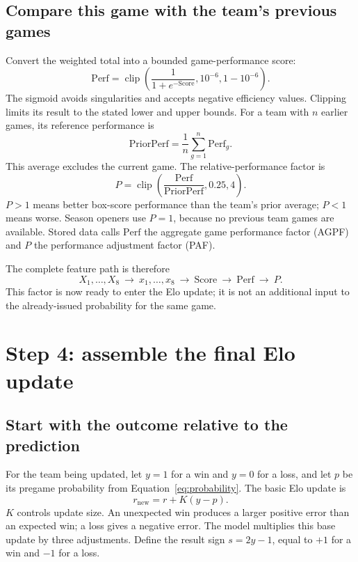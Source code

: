 \documentclass[11pt]{article}
\begin{document}
\subsection{Compare this game with the team's previous games}
Convert the weighted total into a bounded game-performance score:
\begin{equation}\label{eq:game-perf}
 \mathrm{Perf}=\operatorname{clip}
 \left(\frac{1}{1+e^{-\mathrm{Score}}},10^{-6},1-10^{-6}\right).
\end{equation}
The sigmoid avoids singularities and accepts negative efficiency values.
Clipping limits its result to the stated lower and upper bounds.
For a team with $n$ earlier games, its reference performance is
\begin{equation}\label{eq:prior-perf}
 \mathrm{PriorPerf}=\frac{1}{n}\sum_{g=1}^{n}\mathrm{Perf}_g.
\end{equation}
This average excludes the current game. The relative-performance factor is
\begin{equation}\label{eq:performance-factor}
 \boxed{P=\operatorname{clip}
 \left(\frac{\mathrm{Perf}}{\mathrm{PriorPerf}},0.25,4\right)}.
\end{equation}
$P>1$ means better box-score performance than the team's prior average;
$P<1$ means worse. Season openers use $P=1$, because no previous team games
are available. Stored data calls $\mathrm{Perf}$ the aggregate game performance
factor (AGPF) and $P$ the performance adjustment factor (PAF).

The complete feature path is therefore
\begin{equation}\label{eq:feature-path}
 X_1,\ldots,X_8\ \longrightarrow\ x_1,\ldots,x_8
 \ \longrightarrow\ \mathrm{Score}
 \ \longrightarrow\ \mathrm{Perf}\ \longrightarrow\ P.
\end{equation}
This factor is now ready to enter the Elo update; it is not an additional
input to the already-issued probability for the same game.

\section{Step 4: assemble the final Elo update}\label{sec:final}
\subsection{Start with the outcome relative to the prediction}
For the team being updated, let $y=1$ for a win and $y=0$ for a loss, and let
$p$ be its pregame probability from Equation~\eqref{eq:probability}. The
basic Elo update is
\begin{equation}
 r_{\mathrm{new}}=r+K(y-p).
\end{equation}
$K$ controls update size. An unexpected win produces a larger positive error
than an expected win; a loss gives a negative error. The model multiplies this
base update by three adjustments. Define the result sign $s=2y-1$, equal to
$+1$ for a win and $-1$ for a loss.
\end{document}
